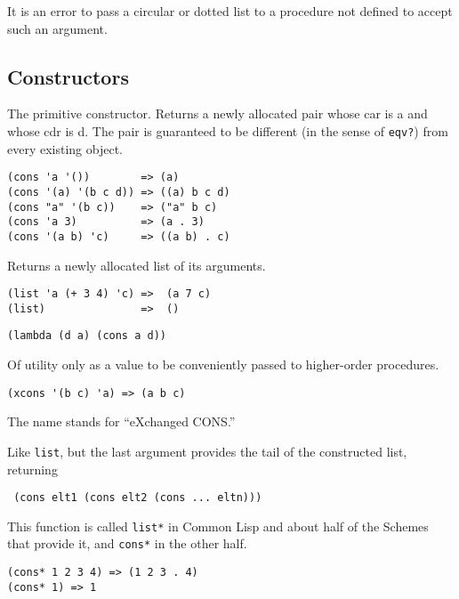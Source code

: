 It is an error to pass a circular or dotted list to a procedure not
defined to accept such an argument.

\subsection{{Constructors}}\label{constructors}

\begin{entry}{%
    }

    The primitive
    constructor. Returns a newly allocated pair whose car is a and
    whose cdr is d. The pair is guaranteed to be different (in the
    sense of \texttt{eqv?}) from every existing object.

\begin{verbatim}
(cons 'a '())        => (a)
(cons '(a) '(b c d)) => ((a) b c d)
(cons "a" '(b c))    => ("a" b c)
(cons 'a 3)          => (a . 3)
(cons '(a b) 'c)     => ((a b) . c)
\end{verbatim}
\end{entry}

\begin{entry}{%
  }

  Returns a newly allocated list of its arguments.

\begin{verbatim}
(list 'a (+ 3 4) 'c) =>  (a 7 c)
(list)               =>  ()
\end{verbatim}
\end{entry}

\begin{entry}{%
    }
\begin{verbatim}
(lambda (d a) (cons a d))
\end{verbatim}

  Of utility only as a value to be conveniently passed to higher-order
  procedures.

\begin{verbatim}
(xcons '(b c) 'a) => (a b c)
\end{verbatim}

  The name stands for ``eXchanged CONS.'' 
\end{entry}

\begin{entry}{%
  }
  
  Like \texttt{list}, but the last
  argument provides the tail of the constructed list, returning

  \texttt{\ (cons\ elt1\ (cons\ elt2\ (cons\ ...\ eltn)))\ \ \ \ \ }

  This function is called \texttt{list*} in
  {Common Lisp} and about half of the
  Schemes that provide it, and \texttt{cons*} in the other half.
\begin{verbatim}
(cons* 1 2 3 4) => (1 2 3 . 4)
(cons* 1) => 1
\end{verbatim}
\end{entry}

